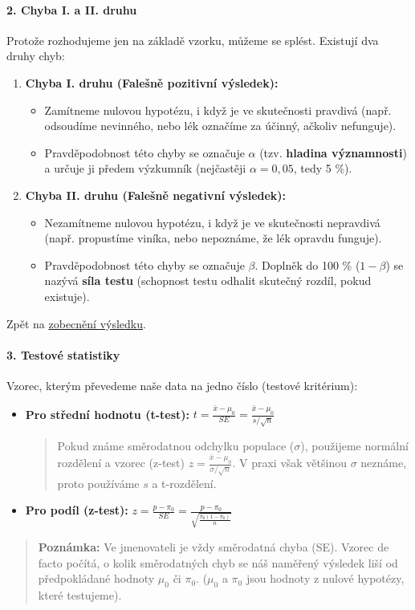 \paragraph*{2. Chyba I. a II. druhu}
\label{pg:chyby}
Protože rozhodujeme jen na základě vzorku, můžeme se splést. Existují dva druhy chyb:
\begin{enumerate}
    \item \textbf{Chyba I. druhu (Falešně pozitivní výsledek):} 
    \begin{itemize}
        \item Zamítneme nulovou hypotézu, i když je ve skutečnosti pravdivá (např. odsoudíme nevinného, nebo lék označíme za účinný, ačkoliv nefunguje).
        \item Pravděpodobnost této chyby se označuje $\alpha$ (tzv. \textbf{hladina významnosti}) a určuje ji předem výzkumník (nejčastěji $\alpha = 0,05$, tedy 5 \%).
    \end{itemize}
    \item \textbf{Chyba II. druhu (Falešně negativní výsledek):}
    \begin{itemize}
        \item Nezamítneme nulovou hypotézu, i když je ve skutečnosti nepravdivá (např. propustíme viníka, nebo nepoznáme, že lék opravdu funguje).
        \item Pravděpodobnost této chyby se označuje $\beta$. Doplněk do 100 \% ($1 - \beta$) se nazývá \textbf{síla testu} (schopnost testu odhalit skutečný rozdíl, pokud existuje).
    \end{itemize}
\end{enumerate}
Zpět na \hyperref[sub:zob-vys]{zobecnění výsledku}.

\paragraph*{3. Testové statistiky}
Vzorec, kterým převedeme naše data na jedno číslo (testové kritérium):
\begin{itemize}
    \item \textbf{Pro střední hodnotu (t-test):} $t = \frac{\bar{x} - \mu_0}{SE} = \frac{\bar{x} - \mu_0}{s/\sqrt{n}}$
    \begin{quote}
        Pokud známe směrodatnou odchylku populace ($\sigma$), použijeme normální rozdělení a vzorec (z-test) $z = \frac{\bar{x} - \mu_0}{\sigma/\sqrt{n}}$. V praxi však většinou $\sigma$ neznáme, proto používáme $s$ a t-rozdělení.
    \end{quote}
    \item \textbf{Pro podíl (z-test):} $z = \frac{p - \pi_0}{SE} = \frac{p - \pi_0}{\sqrt{\frac{\pi_0(1-\pi_0)}{n}}}$
\end{itemize}
\begin{quote}
    \textbf{Poznámka:} Ve jmenovateli je vždy směrodatná chyba (SE). Vzorec de facto počítá, o kolik směrodatných chyb se náš naměřený výsledek liší od předpokládané hodnoty $\mu_0$ či $\pi_0$.
    ($\mu_0$ a $\pi_0$ jsou hodnoty z nulové hypotézy, které testujeme).
\end{quote}

